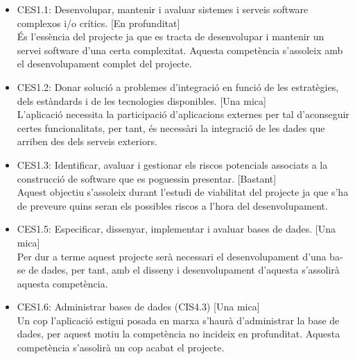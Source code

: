 \begin{itemize}
\item{}CES1.1: Desenvolupar, mantenir i avaluar sistemes i serveis software complexos i/o crítics. [En profunditat]\\
És l’essència del projecte ja que es tracta de desenvolupar i mantenir un servei software d’una certa complexitat. Aquesta competència s’assoleix amb el desenvolupament complet del projecte.
\item{}CES1.2: Donar solució a problemes d’integració en funció de les estratègies, dels estàndards i de les tecnologies disponibles. [Una mica]\\
L’aplicació necessita la participació d’aplicacions externes per tal  d’aconseguir certes funcionalitats, per tant, és necessàri la integració de les dades que arriben des dels serveis exteriors.
\item{}CES1.3: Identificar, avaluar i gestionar els riscos potencials associats a la construcció de software que es poguessin presentar. [Bastant]\\
Aquest objectiu s’assoleix durant l’estudi de viabilitat del projecte ja que s’ha de preveure quins seran els possibles riscos a l’hora del desenvolupament.
\item{}CES1.5: Especificar, dissenyar, implementar i avaluar bases de dades. [Una mica]\\
Per dur a terme aquest projecte serà necessari el desenvolupament d’una ba-
se de dades, per tant, amb el disseny i desenvolupament d’aquesta s’assolirà aquesta competència.
\item{}CES1.6: Administrar bases de dades (CIS4.3) [Una mica]\\
Un cop l’aplicació estigui posada en marxa s’haurà d’administrar la base de
dades, per aquest motiu la competència no incideix en profunditat. Aquesta
competència s’assolirà un cop acabat el projecte.


\end{itemize}
